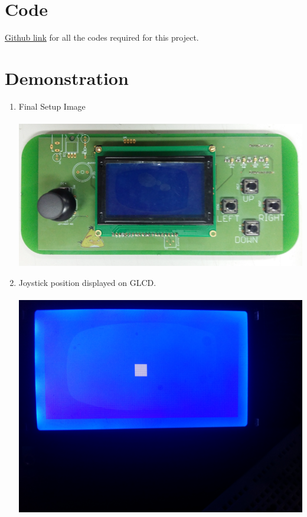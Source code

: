\documentclass[a4paper,12pt,oneside]{book}
\begin{document}
\section{Code}
\href{https://github.com/eYSIP-2016/eYSIP-2016-Around-the-world-of-Embedded-Systems/tree/origin/master/Solutions/development\%20board}{Github link} for all the codes required for this project.


\section{Demonstration}
\begin{enumerate}
\item Final Setup Image\\~\\
\includegraphics[scale=0.5]{abc.PNG}
\item Joystick position displayed on GLCD.\\~\\
\includegraphics[scale=0.07]{20160708_113016.jpg}

\end{enumerate}
\end{document}
